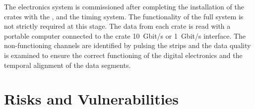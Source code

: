 The electronics system %
is commissioned after completing the installation of the  crates with the , and the timing system. %
The functionality of the full  system is not strictly required at this stage. The data from each crate %
is read with a portable computer connected to the crate  \SI{10}{Gbit/s} or \SI{1}{Gbit/s} interface. %
The non-functioning channels are identified by pulsing the  strips and the data quality is examined to ensure the correct functioning of the digital electronics and the temporal alignment of the data segments.   






\section{Risks and Vulnerabilities}
\label{sec:fddp-tpc-elec-risks}

